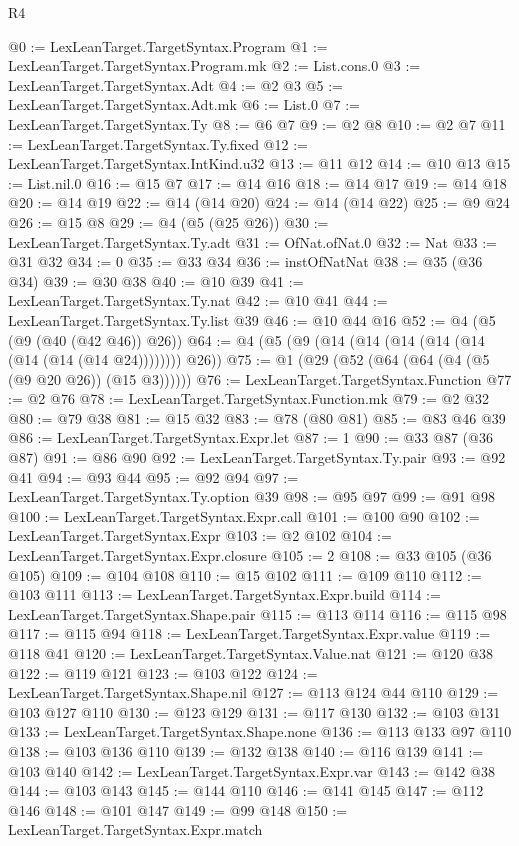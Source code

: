 \begin{lexlean}{R4}
\begin{coremodule}
@0 := LexLeanTarget.TargetSyntax.Program
@1 := LexLeanTarget.TargetSyntax.Program.mk
@2 := List.cons.{0}
@3 := LexLeanTarget.TargetSyntax.Adt
@4 := @2 @3
@5 := LexLeanTarget.TargetSyntax.Adt.mk
@6 := List.{0}
@7 := LexLeanTarget.TargetSyntax.Ty
@8 := @6 @7
@9 := @2 @8
@10 := @2 @7
@11 := LexLeanTarget.TargetSyntax.Ty.fixed
@12 := LexLeanTarget.TargetSyntax.IntKind.u32
@13 := @11 @12
@14 := @10 @13
@15 := List.nil.{0}
@16 := @15 @7
@17 := @14 @16
@18 := @14 @17
@19 := @14 @18
@20 := @14 @19
@22 := @14 (@14 @20)
@24 := @14 (@14 @22)
@25 := @9 @24
@26 := @15 @8
@29 := @4 (@5 (@25 @26))
@30 := LexLeanTarget.TargetSyntax.Ty.adt
@31 := OfNat.ofNat.{0}
@32 := Nat
@33 := @31 @32
@34 := 0
@35 := @33 @34
@36 := instOfNatNat
@38 := @35 (@36 @34)
@39 := @30 @38
@40 := @10 @39
@41 := LexLeanTarget.TargetSyntax.Ty.nat
@42 := @10 @41
@44 := LexLeanTarget.TargetSyntax.Ty.list @39
@46 := @10 @44 @16
@52 := @4 (@5 (@9 (@40 (@42 @46)) @26))
@64 := @4 (@5 (@9 (@14 (@14 (@14 (@14 (@14 (@14 (@14 (@14 @24)))))))) @26))
@75 := @1 (@29 (@52 (@64 (@64 (@4 (@5 (@9 @20 @26)) (@15 @3))))))
@76 := LexLeanTarget.TargetSyntax.Function
@77 := @2 @76
@78 := LexLeanTarget.TargetSyntax.Function.mk
@79 := @2 @32
@80 := @79 @38
@81 := @15 @32
@83 := @78 (@80 @81)
@85 := @83 @46 @39
@86 := LexLeanTarget.TargetSyntax.Expr.let
@87 := 1
@90 := @33 @87 (@36 @87)
@91 := @86 @90
@92 := LexLeanTarget.TargetSyntax.Ty.pair
@93 := @92 @41
@94 := @93 @44
@95 := @92 @94
@97 := LexLeanTarget.TargetSyntax.Ty.option @39
@98 := @95 @97
@99 := @91 @98
@100 := LexLeanTarget.TargetSyntax.Expr.call
@101 := @100 @90
@102 := LexLeanTarget.TargetSyntax.Expr
@103 := @2 @102
@104 := LexLeanTarget.TargetSyntax.Expr.closure
@105 := 2
@108 := @33 @105 (@36 @105)
@109 := @104 @108
@110 := @15 @102
@111 := @109 @110
@112 := @103 @111
@113 := LexLeanTarget.TargetSyntax.Expr.build
@114 := LexLeanTarget.TargetSyntax.Shape.pair
@115 := @113 @114
@116 := @115 @98
@117 := @115 @94
@118 := LexLeanTarget.TargetSyntax.Expr.value
@119 := @118 @41
@120 := LexLeanTarget.TargetSyntax.Value.nat
@121 := @120 @38
@122 := @119 @121
@123 := @103 @122
@124 := LexLeanTarget.TargetSyntax.Shape.nil
@127 := @113 @124 @44 @110
@129 := @103 @127 @110
@130 := @123 @129
@131 := @117 @130
@132 := @103 @131
@133 := LexLeanTarget.TargetSyntax.Shape.none
@136 := @113 @133 @97 @110
@138 := @103 @136 @110
@139 := @132 @138
@140 := @116 @139
@141 := @103 @140
@142 := LexLeanTarget.TargetSyntax.Expr.var
@143 := @142 @38
@144 := @103 @143
@145 := @144 @110
@146 := @141 @145
@147 := @112 @146
@148 := @101 @147
@149 := @99 @148
@150 := LexLeanTarget.TargetSyntax.Expr.match

\end{coremodule}
\end{lexlean}
